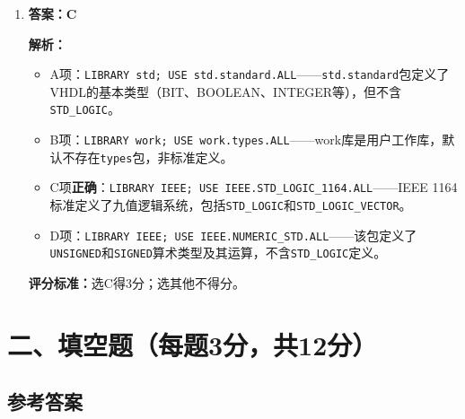 \begin{enumerate}[label=\arabic*., leftmargin=*]
\noindent\textbf{评分标准：}选B得3分；选其他不得分。


\item \textbf{答案：C}

\noindent\textbf{解析：}
\begin{itemize}
  \item A项：\texttt{LIBRARY std; USE std.standard.ALL}——\texttt{std.standard}包定义了VHDL的基本类型（BIT、BOOLEAN、INTEGER等），但不含\texttt{STD\_LOGIC}。
  \item B项：\texttt{LIBRARY work; USE work.types.ALL}——work库是用户工作库，默认不存在\texttt{types}包，非标准定义。
  \item C项\textbf{正确}：\texttt{LIBRARY IEEE; USE IEEE.STD\_LOGIC\_1164.ALL}——IEEE 1164标准定义了九值逻辑系统，包括\texttt{STD\_LOGIC}和\texttt{STD\_LOGIC\_VECTOR}。
  \item D项：\texttt{LIBRARY IEEE; USE IEEE.NUMERIC\_STD.ALL}——该包定义了\texttt{UNSIGNED}和\texttt{SIGNED}算术类型及其运算，不含\texttt{STD\_LOGIC}定义。
\end{itemize}

\noindent\textbf{评分标准：}选C得3分；选其他不得分。

\end{enumerate}

\newpage
\section{二、填空题（每题3分，共12分）}

\subsection*{参考答案}

